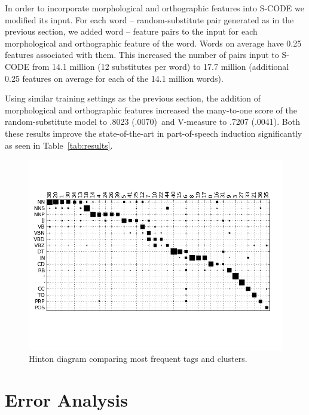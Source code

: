 \documentclass[11pt]{article}
\newcommand{\ftmto}{.8023 (.0070)}
\newcommand{\ftvm}{.7207 (.0041)}
\begin{document}
In order to incorporate morphological and orthographic features into
S-CODE we modified its input.  For each word -- random-substitute pair
generated as in the previous section, we added word -- feature pairs
to the input for each morphological and orthographic feature of the
word.  Words on average have 0.25 features associated with them.
This increased the number of pairs input to S-CODE from 14.1
million (12 substitutes per word) to 17.7 million (additional 0.25
features on average for each of the 14.1 million words).

Using similar training settings as the previous section, the addition
of morphological and orthographic features increased the many-to-one
score of the random-substitute model to \ftmto\ and V-measure to \ftvm.
Both these results improve the state-of-the-art in part-of-speech
induction significantly as seen in Table~\ref{tab:results}.

\begin{figure}[ht] \centering
\vspace*{-25mm}
\includegraphics[width=\textwidth]{hinton.png}
\vspace*{-30mm}
\caption{Hinton diagram comparing most frequent tags and clusters.}
\label{plot-hinton}
\end{figure}

\section{Error Analysis}
\label{sec:discuss}
\end{document}
